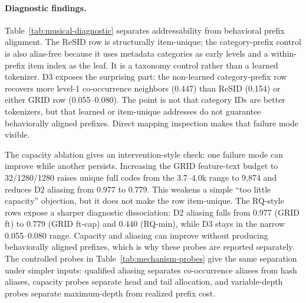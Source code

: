 \paragraph{Diagnostic findings.}
Table~\ref{tab:musical-diagnostic} separates addressability from behavioral
prefix alignment. The ReSID row is structurally item-unique; the category-prefix
control is also alias-free because it uses metadata categories as early levels
and a within-prefix item index as the leaf. It is a taxonomy control rather
than a learned tokenizer. D3 exposes the surprising part: the non-learned
category-prefix row recovers more level-1 co-occurrence neighbors (0.447) than
ReSID (0.154) or either GRID row (0.055--0.080). The point is not that category
IDs are better tokenizers, but that learned or item-unique addresses do not
guarantee behaviorally aligned prefixes. Direct mapping inspection makes that
failure mode visible.

The capacity ablation gives an intervention-style check: one failure mode can
improve while another persists. Increasing the GRID feature-text budget to
32/1280/1280 raises unique full codes from the 3.7--4.0k range to 9,874 and
reduces D2 aliasing from 0.977 to 0.779. This weakens a simple ``too little
capacity'' objection, but it does not make the row item-unique.
The RQ-style rows expose a sharper diagnostic dissociation: D2 aliasing falls
from 0.977 (GRID ft) to 0.779 (GRID ft-cap) and 0.440 (RQ-min), while D3
stays in the narrow 0.055--0.080 range. Capacity and aliasing can improve
without producing behaviorally aligned prefixes, which is why these probes are
reported separately. The controlled probes in Table~\ref{tab:mechanism-probes}
give the same separation under simpler inputs: qualified aliasing separates
co-occurrence aliases from hash aliases, capacity probes separate head and tail
allocation, and variable-depth probes separate maximum-depth from realized
prefix cost.

